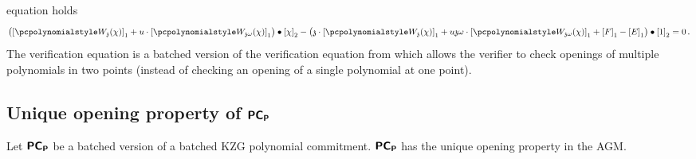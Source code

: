 \documentclass[runningheads,11pt]{llncs}
\begin{document}
\begin{description}
  equation holds
	\begin{multline}
		\label{eq:ver_eq}
		\left( \gone{\p{W_{\chz}}(\chi)} + u \cdot \gone{\p{W_{\chz
                \omega}}(\chi)} \right) \bullet
		\gtwo{\chi} - %
		\left( \chz \cdot \gone{\p{W_{\chz}}(\chi)} + u \chz \omega \cdot
          \gone{\p{W_{\chz \omega}}(\chi)} + \gone{F} - \gone{E} \right) \bullet
        \gtwo{1} = 0\,.
	\end{multline}
  The verification equation is a batched version of the verification equation
  from \cite{AC:KatZavGol10} which allows the verifier to check openings of
  multiple polynomials in two points (instead of checking an opening of a single
  polynomial at one point).
\end{description}

\subsection{Unique opening property of $\bm{\mathsf{PC}}_{\bm{\mathsf{P}}}$}
\begin{lemma}
\label{lem:pcomp_unique_op}
Let $\bm{\mathsf{PC}}_{\bm{\mathsf{P}}}$ be a batched version of a batched KZG polynomial
commitment. $\bm{\mathsf{PC}}_{\bm{\mathsf{P}}}$ has the unique opening property in the AGM.
\end{lemma}
\end{document}

